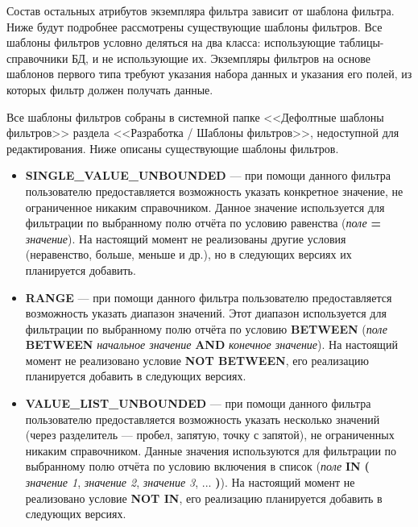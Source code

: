 \documentclass[../user-manual.tex]{subfiles}
\begin{document}
	Состав остальных атрибутов экземпляра фильтра зависит от шаблона фильтра. Ниже будут подробнее рассмотрены существующие шаблоны фильтров. Все шаблоны фильтров условно деляться на два класса: использующие таблицы-справочники БД, и не использующие их. Экземпляры фильтров на основе шаблонов первого типа требуют указания набора данных и указания его полей, из которых фильтр должен получать данные.
	
	Все шаблоны фильтров собраны в системной папке <<Дефолтные шаблоны фильтров>> раздела <<Разработка / Шаблоны фильтров>>, недоступной для редактирования. Ниже описаны существующие шаблоны фильтров.
	
	\begin{itemize}
		\item \textbf{SINGLE\_VALUE\_UNBOUNDED} --- при помощи данного фильтра пользователю предоставляется возможность указать конкретное значение, не ограниченное никаким справочником. Данное значение используется для фильтрации по выбранному полю отчёта по условию равенства (\textit{поле} \textbf{=} \textit{значение}). На настоящий момент не реализованы другие условия (неравенство, больше, меньше и др.), но в следующих версиях их планируется добавить.
		
		\item \textbf{RANGE} --- при помощи данного фильтра пользователю предоставляется возможность указать диапазон значений. Этот диапазон используется для фильтрации по выбранному полю отчёта по условию \textbf{BETWEEN} (\textit{поле} \textbf{BETWEEN} \textit{начальное значение} \textbf{AND} \textit{конечное значение}). На настоящий момент не реализовано условие \textbf{NOT BETWEEN}, его реализацию планируется добавить в следующих версиях.
		
		\item \textbf{VALUE\_LIST\_UNBOUNDED} --- при помощи данного фильтра пользователю предоставляется возможность указать несколько значений (через разделитель --- пробел, запятую, точку с запятой), не ограниченных никаким справочником. Данные значения используются для фильтрации по выбранному полю отчёта по условию включения в список (\textit{поле} \textbf{IN} \textbf{(} \textit{значение 1}, \textit{значение 2}, \textit{значение 3}, ... \textbf{)}). На настоящий момент не реализовано условие \textbf{NOT IN}, его реализацию планируется добавить в следующих версиях.
		

\end{itemize}
\end{document}
